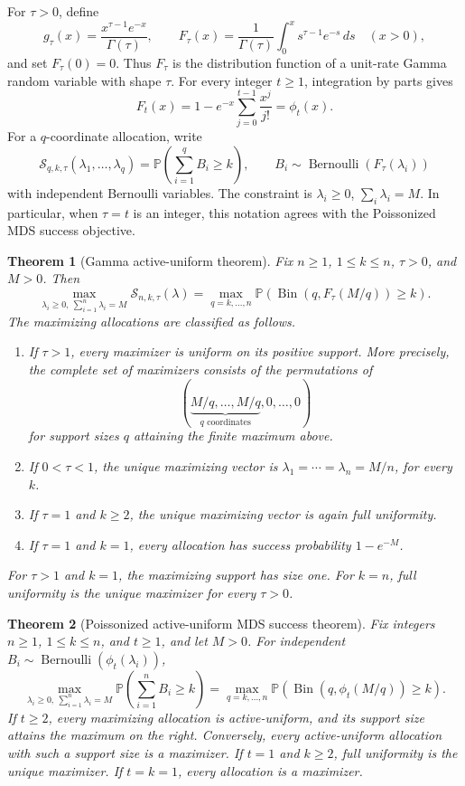 \documentclass[11pt]{article}
\newtheorem{theorem}{Theorem}
\theoremstyle{definition}
\theoremstyle{remark}
\DeclareMathOperator{\Bernoulli}{Bernoulli}
\DeclareMathOperator{\Bin}{Bin}
\newcommand{\Pbb}{\mathbb P}
\newcommand{\1}{\mathbf 1}
\begin{document}
For \(\tau>0\), define
\[
  g_\tau(x)=\frac{x^{\tau-1}e^{-x}}{\Gamma(\tau)},
  \qquad
  F_\tau(x)=\frac{1}{\Gamma(\tau)}
       \int_0^x s^{\tau-1}e^{-s}\,ds
  \quad(x>0),
\]
and set \(F_\tau(0)=0\).  Thus \(F_\tau\) is the distribution function of a unit-rate Gamma random variable with shape \(\tau\).  For every integer \(t\ge1\), integration by parts gives
\[
  F_t(x)=1-e^{-x}\sum_{j=0}^{t-1}\frac{x^j}{j!}
        =\phi_t(x).
\]
For a \(q\)-coordinate allocation, write
\[
  \mathcal S_{q,k,\tau}(\lambda_1,\ldots,\lambda_q)
  =\Pbb\left(\sum_{i=1}^q B_i\ge k\right),
  \qquad B_i\sim\Bernoulli(F_\tau(\lambda_i))
\]
with independent Bernoulli variables.  The constraint is
\(\lambda_i\ge0\), \(\sum_i\lambda_i=M\).  In particular, when \(\tau=t\) is an integer, this notation agrees with the Poissonized MDS success objective.

\begin{theorem}[Gamma active-uniform theorem]
\label{thm:gamma-active-uniform}
Fix \(n\ge1\), \(1\le k\le n\), \(\tau>0\), and \(M>0\).  Then
\[
  \max_{\lambda_i\ge0,\ \sum_{i=1}^n\lambda_i=M}
       \mathcal S_{n,k,\tau}(\lambda)
  =\max_{q=k,\ldots,n}
       \Pbb\left(\Bin(q,F_\tau(M/q))\ge k\right).
\]
The maximizing allocations are classified as follows.
\begin{enumerate}
\item If \(\tau>1\), every maximizer is uniform on its positive support.  More precisely, the complete set of maximizers consists of the permutations of
\[
  (\underbrace{M/q,\ldots,M/q}_{q\text{ coordinates}},0,\ldots,0)
\]
for support sizes \(q\) attaining the finite maximum above.
\item If \(0<\tau<1\), the unique maximizing vector is
\(\lambda_1=\cdots=\lambda_n=M/n\), for every \(k\).
\item If \(\tau=1\) and \(k\ge2\), the unique maximizing vector is again full uniformity.
\item If \(\tau=1\) and \(k=1\), every allocation has success probability \(1-e^{-M}\).
\end{enumerate}
For \(\tau>1\) and \(k=1\), the maximizing support has size one.  For \(k=n\), full uniformity is the unique maximizer for every \(\tau>0\).
\end{theorem}

\begin{theorem}[Poissonized active-uniform MDS success theorem]
\label{thm:full-mds-active-uniform}
Fix integers \(n\ge1\), \(1\le k\le n\), and \(t\ge1\), and let \(M>0\).  For independent
\(B_i\sim\Bernoulli(\phi_t(\lambda_i))\),
\[
  \boxed{
  \max_{\lambda_i\ge0,\ \sum_{i=1}^n\lambda_i=M}
       \Pbb\left(\sum_{i=1}^n B_i\ge k\right)
  =\max_{q=k,\ldots,n}
       \Pbb\left(\Bin(q,\phi_t(M/q))\ge k\right).
  }
\]
If \(t\ge2\), every maximizing allocation is active-uniform, and its support size attains the maximum on the right.  Conversely, every active-uniform allocation with such a support size is a maximizer.  If \(t=1\) and \(k\ge2\), full uniformity is the unique maximizer.  If \(t=k=1\), every allocation is a maximizer.
\end{theorem}
\end{document}
